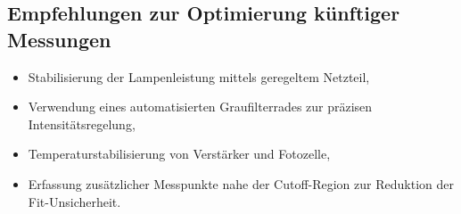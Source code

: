 \subsection*{Empfehlungen zur Optimierung künftiger Messungen}
\begin{itemize}
  \item Stabilisierung der Lampenleistung mittels geregeltem Netzteil,
  \item Verwendung eines automatisierten Graufilterrades zur präzisen Intensitätsregelung,
  \item Temperaturstabilisierung von Verstärker und Fotozelle,
  \item Erfassung zusätzlicher Messpunkte nahe der Cutoff-Region zur Reduktion der Fit-Unsicherheit.
\end{itemize}
